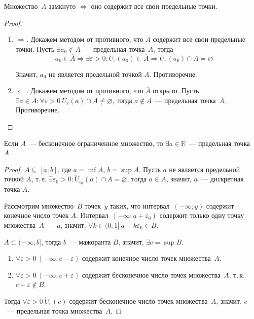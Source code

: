 \begin{statement}
Множество~$A$ замкнуто $\Leftrightarrow$ оно содержит все свои предельные точки.
\end{statement}
\begin{proof}
\begin{enumerate}
	\item $\Rightarrow$. Докажем методом от противного, что $A$ содержит все свои предельные точки.
	Пусть $\exists a_0 \notin A$~--- предельная точка~$A$, тогда
	\begin{equation*}
	a_0 \in \overline A \Rightarrow
	\exists \varepsilon > 0 \colon U_\varepsilon(a_0) \subset \overline A \Rightarrow
	U_\varepsilon(a_0) \cap A = \varnothing
	\end{equation*}
	
	Значит, $a_0$ не является предельной точкой $A$.
	Противоречие.
	
	\item $\Leftarrow$. Докажем методом от противного, что $\overline A$ открыто.
	Пусть $\exists a \in \overline A \colon \forall \varepsilon > 0 \ U_\varepsilon(a) \cap A \neq \varnothing$, тогда $a \notin A$~--- предельная точка~$A$.
	Противоречие.
\end{enumerate}
\end{proof}

\begin{theorem}[Вейерштрасса]
\label{th:Weierstrass}
Если $A$~--- бесконечное ограниченное множество, то $\exists a \in \mathbb R$~--- предельная точка $A$.
\end{theorem}
\begin{proof}
$A \subseteq [a; b]$, где $a = \inf A$, $b = \sup A$.
Пусть $a$ не является предельной точкой $A$, т.\,е. $\exists \varepsilon_0 > 0 \colon \allowbreak \breve U_{\varepsilon_0}(a) \cap A = \varnothing$, тогда $a \in A$, значит, $a$~--- дискретная точка $A$.

Рассмотрим множество~$B$ точек~$y$ таких, что интервал~$(-\infty; y)$ содержит конечное число точек $A$.
Интервал~$(-\infty; a + \varepsilon_0)$ содержит только одну точку множества~$A$~--- $a$, значит, $\forall k \in (0; 1] \ a + k\varepsilon_0 \in B$.

$A \subset (-\infty; b]$, тогда $b$~--- мажоранта $B$, значит, $\exists c = \sup B$.
\begin{enumerate}
	\item $\forall \varepsilon > 0 \ (-\infty; c - \varepsilon)$ содержит конечное число точек множества~$A$.
	\item $\forall \varepsilon > 0 \ (-\infty; c + \varepsilon)$ содержит бесконечное число точек множества~$A$, т.\,к. $c + \varepsilon \notin B$.
\end{enumerate}

Тогда $\forall \varepsilon > 0 \ \breve U_\varepsilon(c)$ содержит бесконечное число точек множества~$A$, значит, $c$~--- предельная точка множества~$A$.
\end{proof}